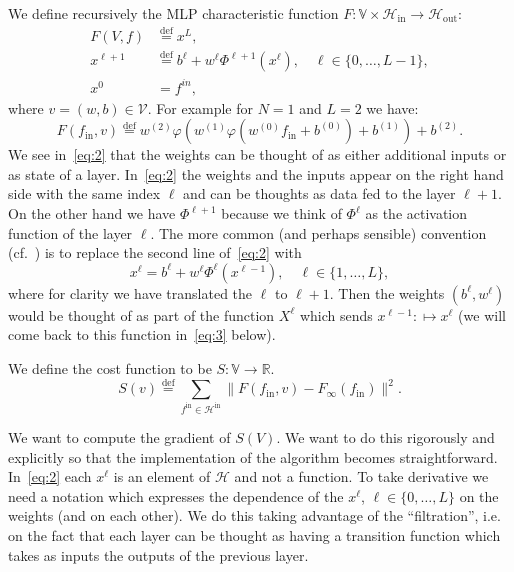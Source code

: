 \documentclass[10pt, a4paper]{article}
\theoremstyle{plain}
\theoremstyle{definition}
\theoremstyle{definition}
\theoremstyle{definition}
\theoremstyle{definition}
\theoremstyle{definition}
\theoremstyle{definition}
\theoremstyle{definition}
\theoremstyle{remark}
\theoremstyle{remark}
\theoremstyle{rudin-style-generic}
\theoremstyle{rudin-style-generic*}
\theoremstyle{rudin-style-theorem}
\newcommand{\deq}{\stackrel{\mathrm{def}}{=}}
\newcommand{\RR}{\mathbb R}
\newcommand*{\fin}{{f^{\text{in}}}}
\begin{document}
  We define recursively the MLP characteristic  function
  $F:\mathbb V\times \mathcal  H_{\text{in}}\rightarrow \mathcal H_{\text{out}}$:
  \begin{equation}
    \label{eq:2}
    \begin{aligned}
      F(V,f) &\deq x^{L} , \\
      x^{\ell+1} &\deq b^\ell + w^\ell \Phi^{\ell+1} ( x^\ell ),\quad \ell \in \{ 0,\dots , L-1\} , \\
      x^{0} &= f^{in},
    \end{aligned}
  \end{equation}
  where $v=(w,b)\in\mathcal V$.
  For example for $N=1$ and $L=2$ we have:
  $$
  F(f_{\text{in}},v) \deq  w^{(2)} \varphi( w^{(1)} \varphi( w^{(0)} f_{\text{in}} + b^{(0)} ) + b^{(1)} ) + b^{(2)} 
  .
  $$
  We see in~\eqref{eq:2}  that the weights can be thought of as either additional inputs or as state of a layer.
  In~\eqref{eq:2} the weights and the inputs appear on the right hand side with the same index $\ell$ and can be thoughts as data fed to the layer $\ell+1$.
  On the other hand we have $\Phi^{\ell+1}$ because we think of $\Phi^\ell$ as the activation function of the layer $\ell$.
  The more common (and perhaps sensible) convention (cf.~\cite{goodfellowDeepLearning2016}) is to replace the second line of~\eqref{eq:2} with
  $$
  x^{\ell} = b^{\ell} + w^{\ell} \Phi^\ell ( x^{\ell-1} ),\quad \ell \in \{ 1,\dots , L\}
  ,
  $$
  where for clarity we have translated the $\ell$ to $\ell+1$.
  Then the weights $(b^{\ell},w^{\ell})$ would be thought of as part of the function $X^{\ell}$ which sends $x^{\ell-1}:\mapsto x^{\ell}$
  (we will come back to this function in~\eqref{eq:3} below).
  
  We define the cost function to be $S:\mathbb V \rightarrow\RR$.
  $$
  S(v) \deq \sum_{\fin\in\mathcal H^{\text{in}}} \|F(f_{\text{in}},v) - F_{\infty}(f_{\text{in}} ) \|^2
  .
  $$

  We want to compute the gradient of $S(V) $.
  We want to do this rigorously and explicitly so that the implementation of the algorithm becomes straightforward.
  In~\eqref{eq:2} each $x^{\ell}$ is an element of $\mathcal H$  and not a function.
  To take derivative we need a notation which expresses the dependence of the $x^{\ell}$, $\ell\in\{0,\dots,L\}$ on the weights (and on each other).
  We do this taking advantage of the ``filtration'', i.e. on the fact that each layer can be thought as having a transition function
  which takes as inputs the outputs of the previous layer.
  
\end{document}

